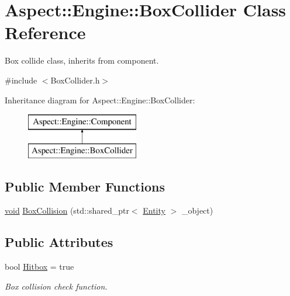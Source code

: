 \hypertarget{class_aspect_1_1_engine_1_1_box_collider}{}\section{Aspect\+:\+:Engine\+:\+:Box\+Collider Class Reference}
\label{class_aspect_1_1_engine_1_1_box_collider}


Box collide class, inherits from component.  




{\ttfamily \#include $<$Box\+Collider.\+h$>$}

Inheritance diagram for Aspect\+:\+:Engine\+:\+:Box\+Collider\+:\begin{figure}[H]
\begin{center}
\leavevmode
\includegraphics[height=2.000000cm]{class_aspect_1_1_engine_1_1_box_collider}
\end{center}
\end{figure}
\subsection*{Public Member Functions}
\begin{DoxyCompactItemize}
\item 
\mbox{\hyperlink{_s_d_l__opengles2__gl2ext_8h_ae5d8fa23ad07c48bb609509eae494c95}{void}} \mbox{\hyperlink{class_aspect_1_1_engine_1_1_box_collider_afc1423c711d7de7123e303942a9809cc}{Box\+Collision}} (std\+::shared\+\_\+ptr$<$ \mbox{\hyperlink{class_aspect_1_1_engine_1_1_entity}{Entity}} $>$ \+\_\+object)
\end{DoxyCompactItemize}
\subsection*{Public Attributes}
\begin{DoxyCompactItemize}
\item 
bool \mbox{\hyperlink{class_aspect_1_1_engine_1_1_box_collider_acd9030e77a23271236fcab865355aa27}{Hitbox}} = true
\begin{DoxyCompactList}\small\item\em Box collision check function. \end{DoxyCompactList}\end{DoxyCompactItemize}


